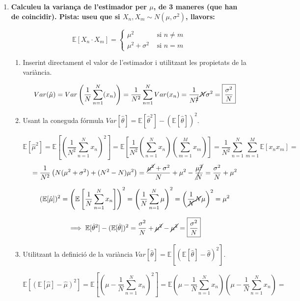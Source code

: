 \documentclass[a4paper]{article}
\begin{document}
\begin{enumerate}
\item \textbf{Calculeu la variança de l'estimador per $\mu$, de 3 maneres (que han de coincidir). Pista: useu que si $X_n, X_m \sim N(\mu, \sigma^2)$, llavors:}

$$ \mathbb{E}[X_n · X_m] = 
\begin{cases}
\mu^2 & \text{ si } n \ne m \\
\mu^2 + \sigma^2 & \text{ si } n = m
\end{cases}$$

\begin{enumerate}
    \item Inserint directament el valor de l'estimador i utilitzant les propietats de la variància.
    
    $$ Var(\hat{\mu}) = Var\left(\frac{1}{N} \sum_{n=1}^{N}(x_n)\right) = \frac{1}{N^2} \sum_{n=1}^{N}Var(x_n) = \frac{1}{N^{\cancel{2}}}\cancel{N}\sigma^2 = \boxed{\frac{\sigma^2}{N}}    $$
    
    \item Usant la coneguda fórmula $Var[\hat{\theta}] = \mathbb{E}[\hat{\theta}^2] - (\mathbb{E}[\hat{\theta}])^2$.
    
    $$ \mathbb{E}[\hat{\mu}^2]  = \mathbb{E}\left[\left(\frac{1}{N^2}\sum_{n=1}^{N}x_n\right)^2\right] =
    \mathbb{E}\left[\frac{1}{N^2} \left(\sum_{n=1}^{N}x_n\right)\left(\sum_{m=1}^{M}x_m\right)\right] = \frac{1}{N^2}\sum_{n=1}^{N}\sum_{m=1}^{M}\mathbb{E}[x_n x_m] = $$
    $$ = \frac{1}{N^2}\left(N(\mu^2+\sigma^2)+(N^2-N)\mu^2\right) = \frac{\cancel{\mu^2}+\sigma^2}{N}+\mu^2-\cancel{\frac{\mu^2}{N}} = \frac{\sigma^2}{N}+\mu^2 $$
    
    $$ (\mathbb{E}[\hat{\mu}])^2 = \left(\mathbb{E}\left[\frac{1}{N}\sum_{n=1}^{N}x_n\right]\right)^2 = \left(\frac{1}{N}\sum_{n=1}^{N}\mu\right)^2 = \left(\frac{1}{\cancel{N}} \cancel{N} \mu\right)^2 = \mu^2 $$
    
    $$ \implies  \mathbb{E}[\hat{\theta}^2] - (\mathbb{E}[\hat{\theta}])^2  = \frac{\sigma^2}{N}+\cancel{\mu^2} - \cancel{\mu^2} = \boxed{\frac{\sigma^2}{N}} $$
    
    \item Utilitzant la definició de la variància $Var[\hat{\theta}] = \mathbb{E}[(\mathbb{E}[\hat{\theta}] - \hat{\theta})^2]$.
    
    $$ \mathbb{E}[(\mathbb{E}[\hat{\mu}]-\hat{\mu})^2] = \mathbb{E}[(\mu-\frac{1}{N}\sum_{n=1}^{N}x_n)^2] = \mathbb{E}(\mu-\frac{1}{N}\sum_{n=1}^{N}x_n)(\mu-\frac{1}{N}\sum_{n=1}^{N}x_n) = $$    
\end{enumerate}


\end{enumerate}
\end{document}

